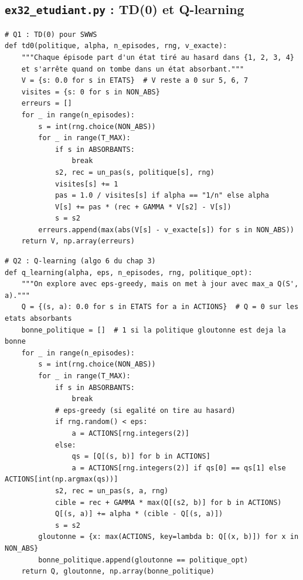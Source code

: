 \documentclass[11pt,a4paper]{article}
\begin{document}
\subsection{\texttt{ex32\_etudiant.py} : TD(0) et Q-learning}

\begin{lstlisting}[firstnumber=107]
# Q1 : TD(0) pour SWWS
def td0(politique, alpha, n_episodes, rng, v_exacte):
    """Chaque épisode part d'un état tiré au hasard dans {1, 2, 3, 4}
    et s'arrête quand on tombe dans un état absorbant."""
    V = {s: 0.0 for s in ETATS}  # V reste a 0 sur 5, 6, 7
    visites = {s: 0 for s in NON_ABS}
    erreurs = []
    for _ in range(n_episodes):
        s = int(rng.choice(NON_ABS))
        for _ in range(T_MAX):
            if s in ABSORBANTS:
                break
            s2, rec = un_pas(s, politique[s], rng)
            visites[s] += 1
            pas = 1.0 / visites[s] if alpha == "1/n" else alpha
            V[s] += pas * (rec + GAMMA * V[s2] - V[s])
            s = s2
        erreurs.append(max(abs(V[s] - v_exacte[s]) for s in NON_ABS))
    return V, np.array(erreurs)
\end{lstlisting}

\begin{lstlisting}[firstnumber=128]
# Q2 : Q-learning (algo 6 du chap 3)
def q_learning(alpha, eps, n_episodes, rng, politique_opt):
    """On explore avec eps-greedy, mais on met à jour avec max_a Q(S', a)."""
    Q = {(s, a): 0.0 for s in ETATS for a in ACTIONS}  # Q = 0 sur les etats absorbants
    bonne_politique = []  # 1 si la politique gloutonne est deja la bonne
    for _ in range(n_episodes):
        s = int(rng.choice(NON_ABS))
        for _ in range(T_MAX):
            if s in ABSORBANTS:
                break
            # eps-greedy (si egalité on tire au hasard)
            if rng.random() < eps:
                a = ACTIONS[rng.integers(2)]
            else:
                qs = [Q[(s, b)] for b in ACTIONS]
                a = ACTIONS[rng.integers(2)] if qs[0] == qs[1] else ACTIONS[int(np.argmax(qs))]
            s2, rec = un_pas(s, a, rng)
            cible = rec + GAMMA * max(Q[(s2, b)] for b in ACTIONS)
            Q[(s, a)] += alpha * (cible - Q[(s, a)])
            s = s2
        gloutonne = {x: max(ACTIONS, key=lambda b: Q[(x, b)]) for x in NON_ABS}
        bonne_politique.append(gloutonne == politique_opt)
    return Q, gloutonne, np.array(bonne_politique)
\end{lstlisting}
\end{document}
